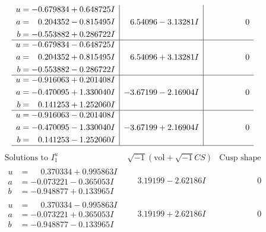 \documentclass[1p]{elsarticle_modified}
\theoremstyle{definition}
\newcommand{\I}{\sqrt{-1}}
\begin{document}
$$\begin{array}{c|c|c}
\begin{aligned}
u &= -0.679834 + 0.648725 I \\
a &= \phantom{-}0.204352 - 0.815495 I \\
b &= -0.553882 + 0.286722 I\end{aligned}
 & \phantom{-}6.54096 - 3.13281 I & \phantom{-0.000000 } 0 \\ \hline\begin{aligned}
u &= -0.679834 - 0.648725 I \\
a &= \phantom{-}0.204352 + 0.815495 I \\
b &= -0.553882 - 0.286722 I\end{aligned}
 & \phantom{-}6.54096 + 3.13281 I & \phantom{-0.000000 } 0 \\ \hline\begin{aligned}
u &= -0.916063 + 0.201408 I \\
a &= -0.470095 + 1.330040 I \\
b &= \phantom{-}0.141253 + 1.252060 I\end{aligned}
 & -3.67199 - 2.16904 I & \phantom{-0.000000 } 0 \\ \hline\begin{aligned}
u &= -0.916063 - 0.201408 I \\
a &= -0.470095 - 1.330040 I \\
b &= \phantom{-}0.141253 - 1.252060 I\end{aligned}
 & -3.67199 + 2.16904 I & \phantom{-0.000000 } 0\\
 \hline 
 \end{array}$$\newpage$$\begin{array}{c|c|c}  
\text{Solutions to }I^u_{1}& \I (\text{vol} + \sqrt{-1}CS) & \text{Cusp shape}\\
 \hline 
\begin{aligned}
u &= \phantom{-}0.370334 + 0.995863 I \\
a &= -0.073221 - 0.365053 I \\
b &= -0.948877 + 0.133965 I\end{aligned}
 & \phantom{-}3.19199 - 2.62186 I & \phantom{-0.000000 } 0 \\ \hline\begin{aligned}
u &= \phantom{-}0.370334 - 0.995863 I \\
a &= -0.073221 + 0.365053 I \\
b &= -0.948877 - 0.133965 I\end{aligned}
 & \phantom{-}3.19199 + 2.62186 I & \phantom{-0.000000 } 0 \\ \hline\begin{aligned}

\end{aligned}
\end{array}$$
\end{document}

